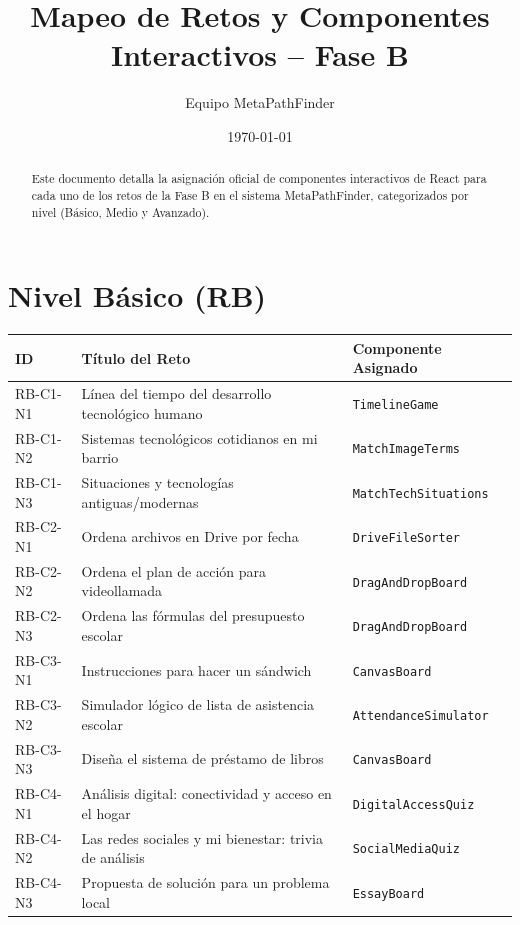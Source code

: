 \documentclass{article}
\title{Mapeo de Retos y Componentes Interactivos -- Fase B}
\author{Equipo MetaPathFinder}
\date{\today}
\begin{document}
\maketitle

\begin{abstract}
Este documento detalla la asignación oficial de componentes interactivos de React para cada uno de los retos de la Fase B en el sistema MetaPathFinder, categorizados por nivel (Básico, Medio y Avanzado).
\end{abstract}

\section*{Nivel Básico (RB)}

\begin{table}[h!]
    \centering
    \renewcommand{\arraystretch}{1.3}
    \begin{tabularx}{\textwidth}{l X l}
        \toprule
        \textbf{ID} & \textbf{Título del Reto} & \textbf{Componente Asignado} \\
        \midrule
        RB-C1-N1 & Línea del tiempo del desarrollo tecnológico humano & \texttt{TimelineGame} \\
        RB-C1-N2 & Sistemas tecnológicos cotidianos en mi barrio & \texttt{MatchImageTerms} \\
        RB-C1-N3 & Situaciones y tecnologías antiguas/modernas & \texttt{MatchTechSituations} \\
        RB-C2-N1 & Ordena archivos en Drive por fecha & \texttt{DriveFileSorter} \\
        RB-C2-N2 & Ordena el plan de acción para videollamada & \texttt{DragAndDropBoard} \\
        RB-C2-N3 & Ordena las fórmulas del presupuesto escolar & \texttt{DragAndDropBoard} \\
        RB-C3-N1 & Instrucciones para hacer un sándwich & \texttt{CanvasBoard} \\
        RB-C3-N2 & Simulador lógico de lista de asistencia escolar & \texttt{AttendanceSimulator} \\
        RB-C3-N3 & Diseña el sistema de préstamo de libros & \texttt{CanvasBoard} \\
        RB-C4-N1 & Análisis digital: conectividad y acceso en el hogar & \texttt{DigitalAccessQuiz} \\
        RB-C4-N2 & Las redes sociales y mi bienestar: trivia de análisis & \texttt{SocialMediaQuiz} \\
        RB-C4-N3 & Propuesta de solución para un problema local & \texttt{EssayBoard} \\
        \bottomrule
    \end{tabularx}
\end{table}
\end{document}
